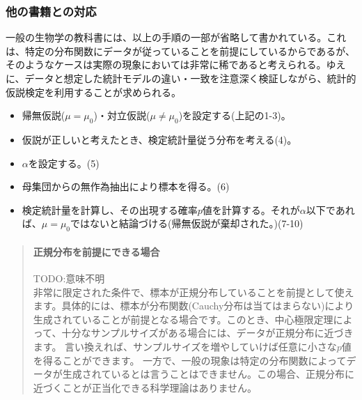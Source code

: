 \documentclass[a4paper,11pt,dvipdfmx]{jsarticle}
\begin{document}
\subsubsection{他の書籍との対応}
一般の生物学の教科書には、以上の手順の一部が省略して書かれている。これは、特定の分布関数にデータが従っていることを前提にしているからであるが、そのようなケースは実際の現象においては非常に稀であると考えられる。ゆえに、データと想定した統計モデルの違い・一致を注意深く検証しながら、統計的仮説検定を利用することが求められる。
\begin{framed}
    \begin{itemize}
        \item 帰無仮説($\mu = \mu_0$)・対立仮説($\mu\neq \mu_0$)を設定する(上記の1-3)。
        \item 仮説が正しいと考えたとき、検定統計量従う分布を考える(4)。
        \item $\alpha$を設定する。(5)
        \item 母集団からの無作為抽出により標本を得る。(6)
        \item 検定統計量を計算し、その出現する確率$p$値を計算する。それが$\alpha$以下であれば、$\mu=\mu_0$ではないと結論づける(帰無仮説が棄却された。)(7-10)
    \end{itemize}
\end{framed}




\begin{mybox}
    \begin{quotation}
\paragraph{正規分布を前提にできる場合}
TODO:意味不明\\
非常に限定された条件で、標本が正規分布していることを前提として使えます。具体的には、標本が分布関数(Cauchy分布は当てはまらない)により生成されていることが前提となる場合です。このとき、中心極限定理によって、十分なサンプルサイズがある場合には、データが正規分布に近づきます。
言い換えれば、サンプルサイズを増やしていけば任意に小さな$p$値を得ることができます。
一方で、一般の現象は特定の分布関数によってデータが生成されているとは言うことはできません。この場合、正規分布に近づくことが正当化できる科学理論はありません。     
    \end{quotation}
\end{mybox}
\end{document}

